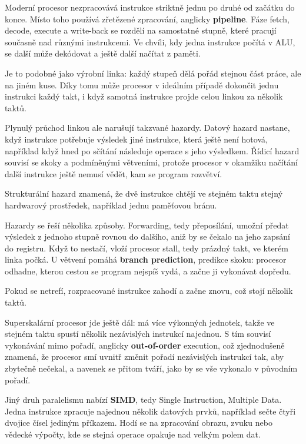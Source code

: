 \documentclass[11pt,a4paper]{article}
\begin{document}
Moderní procesor nezpracovává instrukce striktně jednu po druhé od začátku do konce. Místo toho používá zřetězené zpracování, anglicky \textbf{pipeline}. Fáze fetch, decode, execute a write-back se rozdělí na samostatné stupně, které pracují současně nad různými instrukcemi. Ve chvíli, kdy jedna instrukce počítá v ALU, se další může dekódovat a ještě další načítat z paměti.

Je to podobné jako výrobní linka: každý stupeň dělá pořád stejnou část práce, ale na jiném kuse. Díky tomu může procesor v ideálním případě dokončit jednu instrukci každý takt, i když samotná instrukce projde celou linkou za několik taktů.

Plynulý průchod linkou ale narušují takzvané hazardy. Datový hazard nastane, když instrukce potřebuje výsledek jiné instrukce, která ještě není hotová, například když hned po sčítání následuje operace s jeho výsledkem. Řídicí hazard souvisí se skoky a podmíněnými větveními, protože procesor v okamžiku načítání další instrukce ještě nemusí vědět, kam se program rozvětví.

Strukturální hazard znamená, že dvě instrukce chtějí ve stejném taktu stejný hardwarový prostředek, například jednu paměťovou bránu.

Hazardy se řeší několika způsoby. Forwarding, tedy přeposílání, umožní předat výsledek z jednoho stupně rovnou do dalšího, aniž by se čekalo na jeho zapsání do registru. Když to nestačí, vloží procesor stall, tedy prázdný takt, ve kterém linka počká. U větvení pomáhá \textbf{branch prediction}, predikce skoku: procesor odhadne, kterou cestou se program nejspíš vydá, a začne ji vykonávat dopředu.

Pokud se netrefí, rozpracované instrukce zahodí a začne znovu, což stojí několik taktů.

Superskalární procesor jde ještě dál: má více výkonných jednotek, takže ve stejném taktu spustí několik nezávislých instrukcí najednou. S tím souvisí vykonávání mimo pořadí, anglicky \textbf{out-of-order} execution, což zjednodušeně znamená, že procesor smí uvnitř změnit pořadí nezávislých instrukcí tak, aby zbytečně nečekal, a navenek se přitom tváří, jako by se vše vykonalo v původním pořadí.

Jiný druh paralelismu nabízí \textbf{SIMD}, tedy Single Instruction, Multiple Data. Jedna instrukce zpracuje najednou několik datových prvků, například sečte čtyři dvojice čísel jediným příkazem. Hodí se na zpracování obrazu, zvuku nebo vědecké výpočty, kde se stejná operace opakuje nad velkým polem dat.
\end{document}
